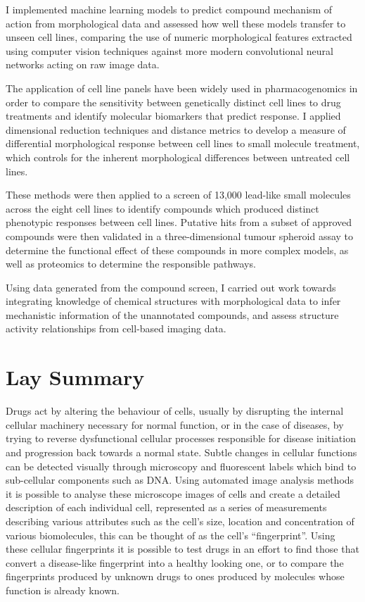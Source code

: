 \documentclass[a4paper,11pt,twoside,openright]{scrbook}
\begin{document}
I implemented machine learning models to predict compound mechanism of action from morphological data and assessed how 
well these models transfer to unseen cell lines, comparing the use of numeric morphological features extracted using 
computer vision techniques against more modern convolutional neural networks acting on raw image data.

The application of cell line panels have been widely used in pharmacogenomics in order to compare the sensitivity 
between genetically distinct cell lines to drug treatments and identify molecular biomarkers that predict response.
I applied dimensional reduction techniques and distance metrics to develop a measure of differential morphological 
response between cell lines to small molecule treatment, which controls for the inherent morphological differences 
between untreated cell lines.

These methods were then applied to a screen of 13,000 lead-like small molecules across the eight cell lines to identify 
compounds which produced distinct phenotypic responses between cell lines.
Putative hits from a subset of approved compounds were then validated in a three-dimensional tumour spheroid assay to 
determine the functional effect of these compounds in more complex models, as well as proteomics to determine the 
responsible pathways.

Using data generated from the compound screen, I carried out work towards integrating knowledge of chemical structures 
with morphological data to infer mechanistic information of the unannotated compounds, and assess structure activity 
relationships from cell-based imaging data.


\chapter*{Lay Summary}

Drugs act by altering the behaviour of cells, usually by disrupting the internal cellular machinery necessary for 
normal function, or in the case of diseases, by trying to reverse dysfunctional cellular processes responsible for 
disease initiation and progression back towards a normal state.
Subtle changes in cellular functions can be detected visually through microscopy and fluorescent labels which bind to 
sub-cellular components such as DNA.
Using automated image analysis methods it is possible to analyse these microscope images of cells and create a detailed 
description of each individual cell, represented as a series of measurements describing various attributes such as the 
cell's size, location and concentration of various biomolecules, this can be thought of as the cell's ``fingerprint''.
Using these cellular fingerprints it is possible to test drugs in an effort to find those that convert a disease-like 
fingerprint into a healthy looking one, or to compare the fingerprints produced by unknown drugs to ones produced by 
molecules whose function is already known.
\end{document}
